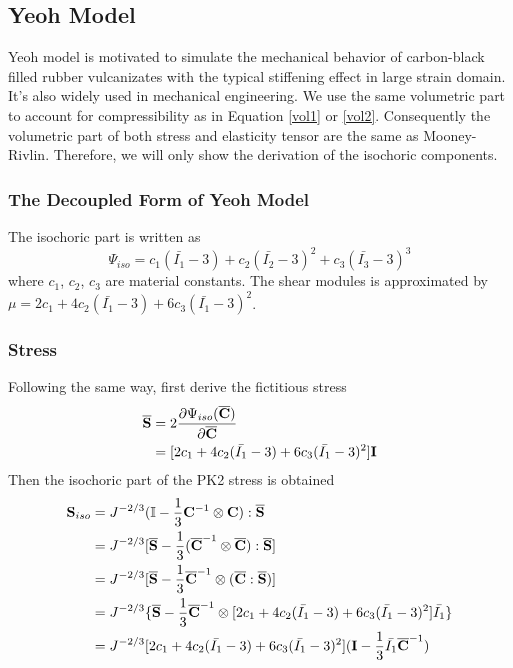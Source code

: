 %
\subsection{Yeoh Model}
Yeoh model is motivated to simulate the mechanical behavior of carbon-black filled rubber vulcanizates with the typical stiffening effect in large strain domain. It's also widely used in mechanical engineering. We use the same volumetric part to account for compressibility as in Equation \ref{vol1} or \ref{vol2}. Consequently the volumetric part of both stress and elasticity tensor are the same as Mooney-Rivlin. Therefore, we will only show the derivation of the isochoric components.

%
\subsubsection{The Decoupled Form of Yeoh Model}
The isochoric part is written as
\begin{equation} \label{isopart}
\Psi_{iso} = c_1(\bar{I_1} - 3) + c_2(\bar{I_2} - 3)^2 + c_3(\bar{I_3} - 3)^3
\end{equation}
where $c_1$, $c_2$, $c_3$ are material constants. The shear modules is approximated by $\mu = 2c_1 + 4c_2(\bar{I_1} - 3) + 6c_3(\bar{I_1} - 3)^2$.

%
\subsubsection{Stress}
Following the same way, first derive the fictitious stress
\begin{equation} \label{yfictitious}
\begin{split}
\overline{\bold{S}} &= 2\frac{\partial\Psi_{iso}({\overline{\bold{C}})}}{\partial\overline{\bold{C}}} \\
&= [2c_1 + 4c_2(\bar{I_1} - 3) + 6c_3(\bar{I_1} - 3)^2] \bold{I} \\
\end{split}
\end{equation}
Then the isochoric part of the PK2 stress is obtained
\begin{equation} \label{ySiso}
\begin{split}
{\bold{S}}_{iso} &= J^{-2/3}(\mathbb{I} - \frac{1}{3}\bold{C}^{-1} \otimes \bold{C}) : \overline{\bold{S}}\\
&= J^{-2/3} [\overline{\bold{S}} - \frac{1}{3}({\overline{\bold{C}}}^{-1} \otimes  {\overline{\bold{C}}}) :  \overline{\bold{S}}] \\
&= J^{-2/3}[\overline{\bold{S}} - \frac{1}{3} \overline{\bold{C}}^{-1} \otimes (\overline{\bold{C}} : \overline{\bold{S}})] \\
&= J^{-2/3}\{\overline{\bold{S}} - \frac{1}{3} \overline{\bold{C}}^{-1} \otimes [2c_1 + 4c_2(\bar{I_1} - 3) + 6c_3(\bar{I_1} - 3)^2] \bar{I_1}\}\\
&= J^{-2/3}[2c_1 + 4c_2(\bar{I_1} - 3) + 6c_3(\bar{I_1} - 3)^2] (\bold{I} - \frac{1}{3}\bar{I_1}{\overline{\bold{C}}}^{-1})
\end{split}
\end{equation}

